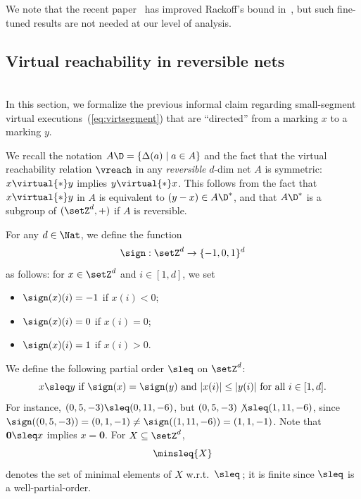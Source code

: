 \begin{rem}
We note that the recent
paper~\cite{kunnemann_et_al:LIPIcs.ICALP.2023.131} has improved Rackoff's
bound in~\cite{DBLP:journals/tcs/Rackoff78}, but such fine-tuned
results are not needed at our level of analysis.
\end{rem}


\subsection{Virtual reachability in reversible 
nets}\label{subsec:virtrevers}
\hfill\\

In this section, we formalize the previous informal claim regarding small-segment
virtual executions~(\ref{eq:virtsegment})
that are ``directed'' from a marking $x$ to a marking $y$.


We recall the notation $A\D=\{\Delta(a)\mid a\in
A\}$ and the fact that
the virtual reachability relation $\vreach$ in any
\emph{reversible} $d$-dim net $A$ is
symmetric: $x\virtual{*}y$ implies $y\virtual{*}x$.
This follows from the fact that $x\virtual{*}y$ in $A$ is equivalent to
$(y-x)\in A\D^*$, and that 
$A\D^*$  is a subgroup of
$(\setZ^d,+)$ if $A$ is reversible.


For any $d\in\Nat$, we define the function 
\begin{equation*}
\sign:\setZ^d\to\{-1,0,1\}^d
\end{equation*}
as follows:
 for $x\in\setZ^d$ and $i\in[1,d]$, we set
\begin{itemize}
	\item		
 $\sign(x)(i)=-1$ if $x(i)<0$;
\item
$\sign(x)(i)=0$ if $x(i)=0$;
\item
		$\sign(x)(i)=1$ if $x(i)>0$.
\end{itemize}
		We define the following partial order $\sleq$ on $\setZ^d$:
\begin{equation*}
	\textnormal{$x\sleq y$\ if $\sign(x)=\sign(y)$ and $|x(i)|\leq
	|y(i)|$ for all $i\in [1,d]$.} 
\end{equation*}
For instance, $(0,5,-3)\sleq (0,11,-6)$, but 
 $(0,5,-3)\not\sleq (1,11,-6)$, since
 $\sign((0,5,-3))=(0,1,-1)\neq\sign((1,11,-6))=(1,1,-1)$.
Note that $\mathbf{0}\sleq x$ implies $x=\mathbf{0}$.
For $X\subseteq \setZ^d$, 
\[\minsleq{X}\]
denotes the set of 
minimal elements of $X$ w.r.t.\ $\sleq$\,; it is finite
since
$\sleq$ is a well-partial-order.

